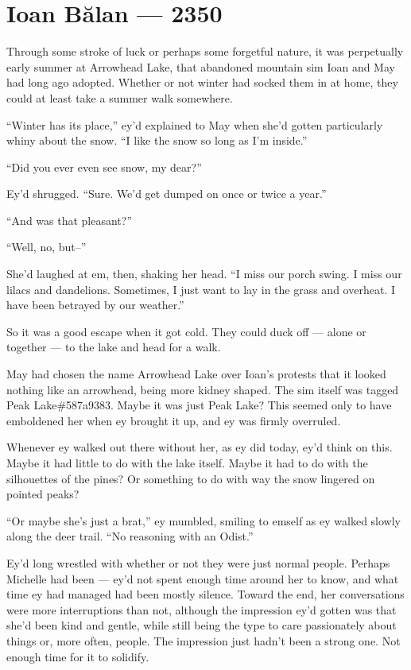 \hypertarget{ioan-bux103lan-2350}{%
\chapter{Ioan Bălan — 2350}\label{ioan-bux103lan-2350}}

Through some stroke of luck or perhaps some forgetful nature, it was perpetually early summer at Arrowhead Lake, that abandoned mountain sim Ioan and May had long ago adopted. Whether or not winter had socked them in at home, they could at least take a summer walk somewhere.

``Winter has its place,'' ey'd explained to May when she'd gotten particularly whiny about the snow. ``I like the snow so long as I'm inside.''

``Did you ever even see snow, my dear?''

Ey'd shrugged. ``Sure. We'd get dumped on once or twice a year.''

``And was that pleasant?''

``Well, no, but--''

She'd laughed at em, then, shaking her head. ``I miss our porch swing. I miss our lilacs and dandelions. Sometimes, I just want to lay in the grass and overheat. I have been betrayed by our weather.''

So it was a good escape when it got cold. They could duck off — alone or together — to the lake and head for a walk.

May had chosen the name Arrowhead Lake over Ioan's protests that it looked nothing like an arrowhead, being more kidney shaped. The sim itself was tagged Peak Lake\#587a9383. Maybe it was just Peak Lake? This seemed only to have emboldened her when ey brought it up, and ey was firmly overruled.

Whenever ey walked out there without her, as ey did today, ey'd think on this. Maybe it had little to do with the lake itself. Maybe it had to do with the silhouettes of the pines? Or something to do with way the snow lingered on pointed peaks?

``Or maybe she's just a brat,'' ey mumbled, smiling to emself as ey walked slowly along the deer trail. ``No reasoning with an Odist.''

Ey'd long wrestled with whether or not they were just normal people. Perhaps Michelle had been — ey'd not spent enough time around her to know, and what time ey had managed had been mostly silence. Toward the end, her conversations were more interruptions than not, although the impression ey'd gotten was that she'd been kind and gentle, while still being the type to care passionately about things or, more often, people. The impression just hadn't been a strong one. Not enough time for it to solidify.

